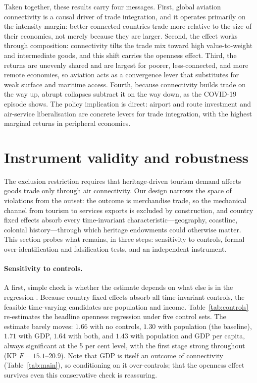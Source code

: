 Taken together, these results carry four messages. First, global aviation
connectivity is a causal driver of trade integration, and it operates primarily on
the intensity margin: better-connected countries trade more relative to the size
of their economies, not merely because they are larger. Second, the effect works
through composition: connectivity tilts the trade mix toward high value-to-weight
and intermediate goods, and this shift carries the openness effect. Third, the
returns are unevenly shared and are largest for poorer, less-connected, and more
remote economies, so aviation acts as a convergence lever that substitutes for
weak surface and maritime access. Fourth, because connectivity builds trade on
the way up, abrupt collapses subtract it on the way down, as the COVID-19 episode
shows. The policy implication is direct: airport and route investment and
air-service liberalisation are concrete levers for trade integration, with the
highest marginal returns in peripheral economies.

\section{Instrument validity and robustness}
\label{sec:robust}
The exclusion restriction requires that heritage-driven tourism demand affects
goods trade only through air connectivity. Our design narrows the space of
violations from the outset: the outcome is merchandise trade, so the mechanical
channel from tourism to services exports is excluded by construction, and
country fixed effects absorb every time-invariant characteristic---geography,
coastline, colonial history---through which heritage endowments could otherwise
matter. This section probes what remains, in three steps: sensitivity to
controls, formal over-identification and falsification tests, and an
independent instrument.

\paragraph{Sensitivity to controls.} A first, simple check is whether the
estimate depends on what else is in the regression \citep[cf.][]{Frankel_1999}.
Because country fixed effects absorb all time-invariant controls, the feasible
time-varying candidates are population and income. Table~\ref{tab:controls}
re-estimates the headline openness regression under five control sets. The
estimate barely moves: $1.66$ with no controls, $1.30$ with population (the
baseline), $1.71$ with GDP, $1.64$ with both, and $1.43$ with population and
GDP per capita, always significant at the 5 per cent level, with the first
stage strong throughout (KP $F=15.1$--$20.9$). Note that GDP is itself an
outcome of connectivity (Table~\ref{tab:main}), so conditioning on it
over-controls; that the openness effect survives even this conservative check
is reassuring.

